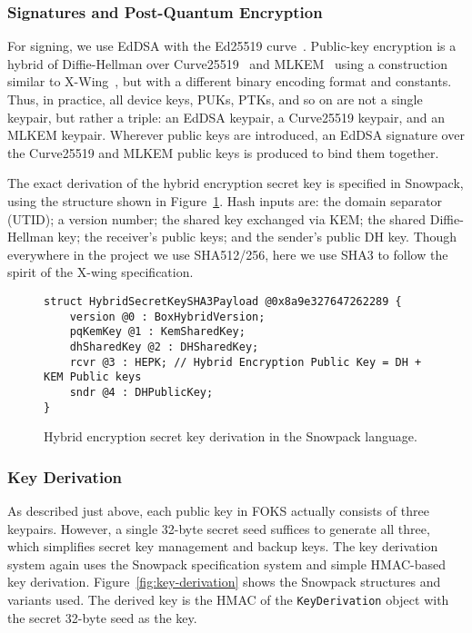 \subsubsection{Signatures and Post-Quantum Encryption}

For signing, we use EdDSA with the Ed25519 curve~\cite{eddsa}.  Public-key
encryption is a hybrid of Diffie-Hellman over
Curve25519~\cite{cryptoeprint:2011:141} and MLKEM~\cite{nist-fips-203} using a
construction similar to X-Wing~\cite{xwing}, but with a different binary
encoding format and constants. Thus, in practice, all device keys, PUKs,
PTKs, and so on are not a single keypair, but rather a triple: an EdDSA 
keypair, a Curve25519 keypair, and an MLKEM keypair. Wherever public keys
are introduced, an EdDSA signature over the Curve25519 and MLKEM public keys
is produced to bind them together.

The exact derivation of the hybrid encryption secret key is specified in 
Snowpack, using the structure shown in Figure~\ref{fig:xwing}. Hash inputs are:
the domain separator (UTID); a version number; the shared key exchanged via KEM;
the shared Diffie-Hellman key; the receiver's public keys; and the sender's
public DH key. Though everywhere in the project we use SHA512/256, here we 
use SHA3 to follow the spirit of the X-wing specification.

\begin{figure}[ht]
  \centering
  \begin{verbatim}
struct HybridSecretKeySHA3Payload @0x8a9e327647262289 {
    version @0 : BoxHybridVersion;
    pqKemKey @1 : KemSharedKey;
    dhSharedKey @2 : DHSharedKey; 
    rcvr @3 : HEPK; // Hybrid Encryption Public Key = DH + KEM Public keys
    sndr @4 : DHPublicKey;
}
  \end{verbatim}
  \caption{Hybrid encryption secret key derivation in the Snowpack language.}
  \label{fig:xwing}
\end{figure}

\subsubsection{Key Derivation}
\label{sec:xwing-key-derivation}

As described just above, each public key in FOKS actually consists of three keypairs. However,
a single 32-byte secret seed suffices to generate all three, which simplifies secret key
management and backup keys.  The key derivation system again uses the Snowpack specification
system and simple HMAC-based key derivation. Figure~\ref{fig:key-derivation} shows the 
Snowpack structures and variants used. The derived key is the HMAC of the \texttt{KeyDerivation} object
with the secret 32-byte seed as the key.

